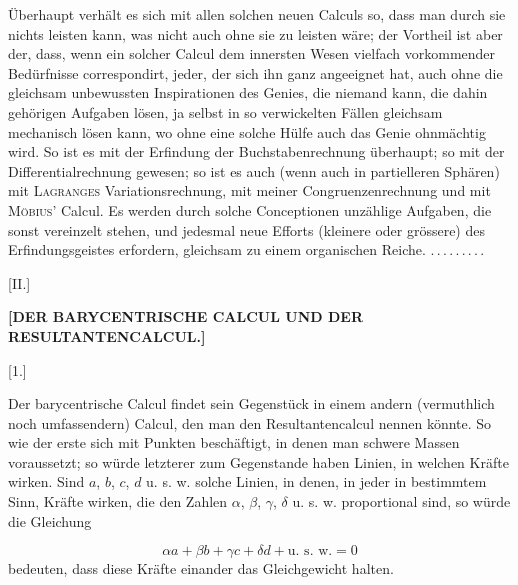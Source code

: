 \par{}
\indent Überhaupt verhält es sich mit allen solchen neuen Calculs so, dass man durch sie
nichts leisten kann, was nicht auch ohne sie zu leisten wäre; der Vortheil ist aber
der, dass, wenn ein solcher Calcul dem innersten Wesen vielfach vorkommender
Bedürfnisse correspondirt, jeder, der sich ihn ganz angeeignet hat, auch ohne die
gleichsam unbewussten Inspirationen des Genies, die niemand  kann, die dahin
gehörigen Aufgaben lösen, ja selbst in so verwickelten Fällen gleichsam mechanisch
lösen kann, wo ohne eine solche Hülfe auch das Genie ohnmächtig wird. So ist es mit
der Erfindung der Buchstabenrechnung überhaupt; so mit der Differentialrechnung
gewesen; so ist es auch (wenn auch in partielleren Sphären) mit \textsc{Lagranges}
Variationsrechnung, mit meiner Congruenzenrechnung und mit \textsc{Möbius}' Calcul. Es
werden durch solche Conceptionen unzählige Aufgaben, die sonst vereinzelt stehen, und
jedesmal neue Efforts (kleinere oder grössere) des Erfindungsgeistes erfordern,
gleichsam zu einem organischen Reiche. \mbox{.\,.\,.\,.\,.\,.\,.\,.\,.}

\begin{center}
\medskip

[II.]

\textbf{[DER BARYCENTRISCHE CALCUL UND DER RESULTANTENCALCUL.]}

[1.]
\end{center}

Der barycentrische Calcul findet sein Gegenstück in einem andern (vermuthlich noch
umfassendern) Calcul, den man den Resultantencalcul nennen könnte. So wie der erste
sich mit Punkten beschäftigt, in denen man schwere Massen voraussetzt; so würde
letzterer zum Gegenstande haben Linien, in welchen Kräfte wirken. Sind $a$, $b$, $c$,
$d$ u. s. w. solche Linien, in denen, in jeder in bestimmtem Sinn, Kräfte wirken, die
den Zahlen $\alpha$, $\beta$, $\gamma$, $\delta$ u. s. w. proportional sind, so würde
die Gleichung

\[
\alpha a + \beta b + \gamma c + \delta d + \text{u. s. w.} = 0
\]
\noindent bedeuten, dass diese Kräfte einander das Gleichgewicht halten.
